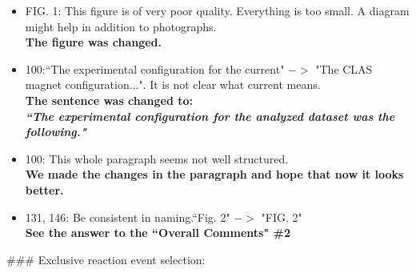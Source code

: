\documentclass[,superscriptaddress,showpacs,amssymb,amsmath,amsfonts,linenumbers,article]{revtex4-1}
\begin{document}
\begin{itemize}

\item FIG. 1: This figure is of very poor quality. Everything is too small. A diagram might help in addition to photographs.\\
{\bf The figure was changed.}


\item  100:``The experimental configuration for the current" $->$ "The CLAS magnet configuration...". It is not clear what current means.\\
{\bf The sentence was changed to:\\
\textbf{\textit{``The experimental configuration for the analyzed dataset was the following."}}
}

\item  100: This whole paragraph seems not well structured.\\
{\bf We made the changes in the paragraph and hope that now it looks better.
}


\item  131, 146: Be consistent in naming.``Fig. 2" $->$ "FIG. 2" \\[0.5cm]
{\bf See the answer to the ``Overall Comments" \#2}

\end{itemize}


\#\#\# Exclusive reaction event selection:\\[0.5cm]
\end{document}
